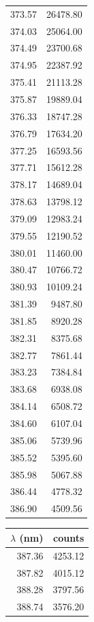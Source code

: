 \begin{table}[!h]
\begin{tabular}{rr}
          373.57 &  26478.80 \\
          374.03 &  25064.00 \\
          374.49 &  23700.68 \\
          374.95 &  22387.92 \\
          375.41 &  21113.28 \\
          375.87 &  19889.04 \\
          376.33 &  18747.28 \\
          376.79 &  17634.20 \\
          377.25 &  16593.56 \\
          377.71 &  15612.28 \\
          378.17 &  14689.04 \\
          378.63 &  13798.12 \\
          379.09 &  12983.24 \\
          379.55 &  12190.52 \\
          380.01 &  11460.00 \\
          380.47 &  10766.72 \\
          380.93 &  10109.24 \\
          381.39 &   9487.80 \\
          381.85 &   8920.28 \\
          382.31 &   8375.68 \\
          382.77 &   7861.44 \\
          383.23 &   7384.84 \\
          383.68 &   6938.08 \\
          384.14 &   6508.72 \\
          384.60 &   6107.04 \\
          385.06 &   5739.96 \\
          385.52 &   5395.60 \\
          385.98 &   5067.88 \\
          386.44 &   4778.32 \\
          386.90 &   4509.56 \\ 
\bottomrule
\end{tabular}
\begin{tabular}{rr}
\toprule
 $\lambda$ (nm) &    counts \\
\midrule   
          387.36 &   4253.12 \\
          387.82 &   4015.12 \\
          388.28 &   3797.56 \\
          388.74 &   3576.20 \\

\end{tabular}
\end{table}
